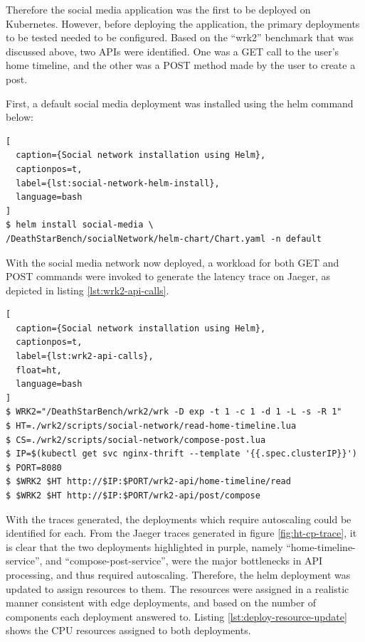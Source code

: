 Therefore the social media application was the first to be deployed on Kubernetes. However, before deploying the application, the primary deployments to be tested needed to be configured. Based on the ``wrk2'' benchmark that was discussed above, two APIs were identified. One was a GET call to the user's home timeline, and the other was a POST method made by the user to create a post.\par

First, a default social media deployment was installed using the helm command below:

\begin{lstlisting}[
  caption={Social network installation using Helm},
  captionpos=t,
  label={lst:social-network-helm-install},
  language=bash
]
$ helm install social-media \
/DeathStarBench/socialNetwork/helm-chart/Chart.yaml -n default
\end{lstlisting}

With the social media network now deployed, a workload for both GET and POST commands were invoked to generate the latency trace on Jaeger, as depicted in listing \ref{lst:wrk2-api-calls}.

\begin{lstlisting}[
  caption={Social network installation using Helm},
  captionpos=t,
  label={lst:wrk2-api-calls},
  float=ht,
  language=bash
]
$ WRK2="/DeathStarBench/wrk2/wrk -D exp -t 1 -c 1 -d 1 -L -s -R 1"
$ HT=./wrk2/scripts/social-network/read-home-timeline.lua
$ CS=./wrk2/scripts/social-network/compose-post.lua
$ IP=$(kubectl get svc nginx-thrift --template '{{.spec.clusterIP}}')
$ PORT=8080
$ $WRK2 $HT http://$IP:$PORT/wrk2-api/home-timeline/read
$ $WRK2 $HT http://$IP:$PORT/wrk2-api/post/compose
\end{lstlisting}

With the traces generated, the deployments which require autoscaling could be identified for each. From the Jaeger traces generated in figure \ref{fig:ht-cp-trace}, it is clear that the two deployments highlighted in purple, namely ``home-timeline-service'', and ``compose-post-service'', were the major bottlenecks in API processing, and thus required autoscaling. Therefore, the helm deployment was updated to assign resources to them. The resources were assigned in a realistic manner consistent with edge deployments, and based on the number of components each deployment answered to. Listing \ref{lst:deploy-resource-update} shows the CPU resources assigned to both deployments.\par

